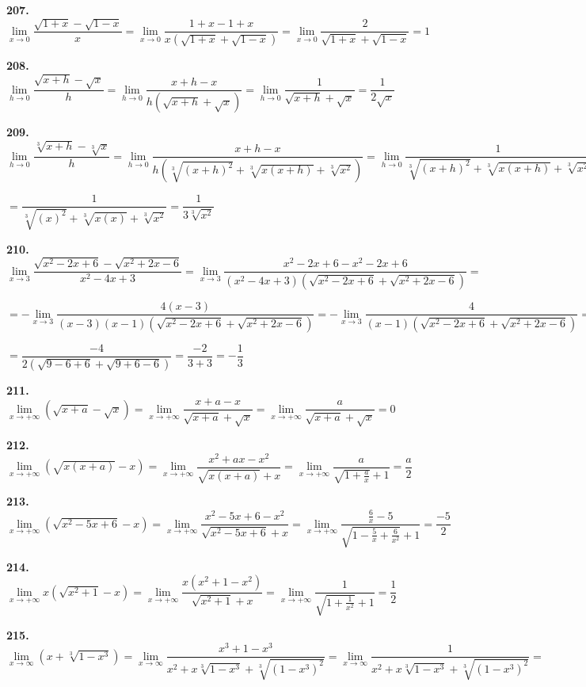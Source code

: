 \documentclass[12pt]{article}
\begin{document}
	\medskip
	{\bf 207.} $\lim\limits_{x\to0} \dfrac{\sqrt{1+x}-\sqrt{1-x}}{x} = \lim\limits_{x\to0} \dfrac{1+x-1+x}{x(\sqrt{1+x}+\sqrt{1-x})} = \lim\limits_{x\to0} \dfrac{2}{\sqrt{1+x}+\sqrt{1-x}} = 1$
	
	\medskip
	{\bf 208.} $\lim\limits_{h\to0} \dfrac{\sqrt{x+h}-\sqrt{x}}{h} = \lim\limits_{h\to0} \dfrac{x+h-x}{h(\sqrt{x+h}+\sqrt{x})} = \lim\limits_{h\to0} \dfrac{1}{\sqrt{x+h}+\sqrt{x}} = \dfrac{1}{2\sqrt{x}}$
	
	\medskip
	{\bf 209.} $\lim\limits_{h\to0} \dfrac{\sqrt[3]{x+h}-\sqrt[3]{x}}{h} = \lim\limits_{h\to0} \dfrac{x+h-x}{h(\sqrt[3]{(x+h)^2}+\sqrt[3]{x(x+h)}+\sqrt[3]{x^2})} = \lim\limits_{h\to0} \dfrac{1}{\sqrt[3]{(x+h)^2}+\sqrt[3]{x(x+h)}+\sqrt[3]{x^2}} =$
	
	$=\dfrac{1}{\sqrt[3]{(x)^2}+\sqrt[3]{x(x)}+\sqrt[3]{x^2}} = \dfrac{1}{3\sqrt[3]{x^2}}$
	
	\medskip
	{\bf 210.} $\lim\limits_{x\to3} \dfrac{\sqrt{x^2-2x+6}-\sqrt{x^2+2x-6}}{x^2-4x+3} = \lim\limits_{x\to3} \dfrac{x^2-2x+6-x^2-2x+6}{(x^2-4x+3)(\sqrt{x^2-2x+6}+\sqrt{x^2+2x-6})} = $
	
	$
	=-\lim\limits_{x\to3}\dfrac{4(x-3)}{(x-3)(x-1)(\sqrt{x^2-2x+6}+\sqrt{x^2+2x-6})} = -\lim\limits_{x\to3} \dfrac{4}{(x-1)(\sqrt{x^2-2x+6}+\sqrt{x^2+2x-6})} = 
	$
	
	$
	= \dfrac{-4}{2(\sqrt{9-6+6}+\sqrt{9+6-6})} = \dfrac{-2}{3+3} = -\dfrac{1}{3}
	$
	
	\medskip
	{\bf 211.} $\lim\limits_{x\to+\infty} (\sqrt{x+a}-\sqrt{x}) = \lim\limits_{x\to+\infty} \dfrac{x+a-x}{\sqrt{x+a}+\sqrt{x}} = \lim\limits_{x\to+\infty} \dfrac{a}{\sqrt{x+a}+\sqrt{x}} = 0$
	
	\medskip
	{\bf 212.} $\lim\limits_{x\to+\infty} (\sqrt{x(x+a)}-x) = \lim\limits_{x\to+\infty} \dfrac{x^2+ax-x^2}{\sqrt{x(x+a)}+x} = \lim\limits_{x\to+\infty} \dfrac{a}{\sqrt{1+\frac{a}{x}}+1} = \dfrac{a}{2}$
	
	\medskip
	{\bf 213.} $\lim\limits_{x\to+\infty}(\sqrt{x^2-5x+6}-x) = \lim\limits_{x\to+\infty} \dfrac{x^2-5x+6-x^2}{\sqrt{x^2-5x+6}+x} = \lim\limits_{x\to+\infty} \dfrac{\frac{6}{x}-5}{\sqrt{1-\frac{5}{x}+\frac{6}{x^2}}+1} = \dfrac{-5}{2}$
	
	\medskip
	{\bf 214.} $\lim\limits_{x\to+\infty} x(\sqrt{x^2+1}-x) = \lim\limits_{x\to+\infty} \dfrac{x(x^2+1-x^2)}{\sqrt{x^2+1}+x} = \lim\limits_{x\to+\infty} \dfrac{1}{\sqrt{1+\frac{1}{x^2}}+1} = \dfrac{1}{2}$

	\medskip
	{\bf 215.} $\lim\limits_{x\to\infty}(x+\sqrt[3]{1-x^3}) = \lim\limits_{x\to\infty} \dfrac{x^3+1-x^3}{x^2+x\sqrt[3]{1-x^3}+\sqrt[3]{(1-x^3)^2}} = \lim\limits_{x\to\infty} \dfrac{1}{x^2+x\sqrt[3]{1-x^3}+\sqrt[3]{(1-x^3)^2}} = $
	
\end{document}
